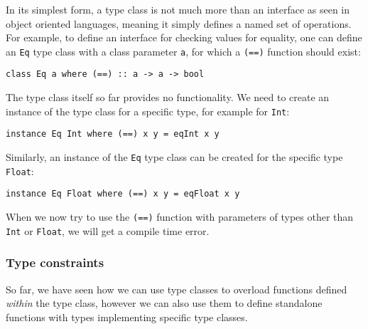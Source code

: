 In its simplest form, a type class is not much more than an interface as seen in object oriented languages, meaning it simply defines a named set of operations. For example, to define an interface for checking values for equality, one can define an \verb|Eq| type class with a class parameter \verb|a|, for which a \verb|(==)| function should exist:
\begin{verbatim}
class Eq a where (==) :: a -> a -> bool
\end{verbatim}
The type class itself so far provides no functionality. We need to create an instance of the type class for a specific type, for example for \verb|Int|:
\begin{verbatim}
instance Eq Int where (==) x y = eqInt x y
\end{verbatim}
Similarly, an instance of the \verb|Eq| type class can be created for the specific type \verb|Float|:
\begin{verbatim}
instance Eq Float where (==) x y = eqFloat x y
\end{verbatim}
When we now try to use the \verb|(==)| function with parameters of types other than \verb|Int| or \verb|Float|, we will get a compile time error.

\subsubsection{Type constraints}\label{constraints}

So far, we have seen how we can use type classes to overload functions defined \textit{within} the type class, however we can also use them to define standalone functions with types implementing specific type classes.

